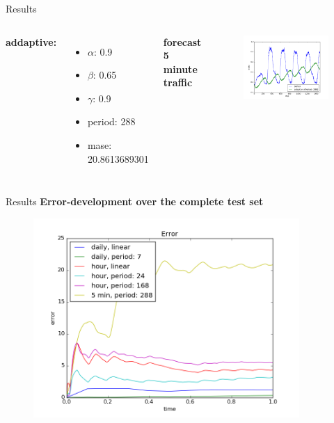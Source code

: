 \documentclass{beamer}
\begin{document}
  \begin{frame}{Results}
    \begin{columns}[c]
      \textbf{addaptive:}
      \begin{itemize}
	\item $\alpha$: 0.9 
	\item $\beta$: 0.65
	\item $\gamma$: 0.9
	\item period: 288
	\item mase: 20.8613689301
      \end{itemize}
    
      \textbf{forecast 5 minute traffic}
      \begin{figure}
	\includegraphics[width=1.1\textwidth]{images/5min.png}
      \end{figure}
    \end{columns}
  \end{frame}

   \begin{frame}{Results}
      \center \textbf{Error-development over the complete test set}
      \begin{figure}
	\includegraphics[width=0.9\textwidth]{images/error.png}
      \end{figure}
  \end{frame}
 
\end{document}

